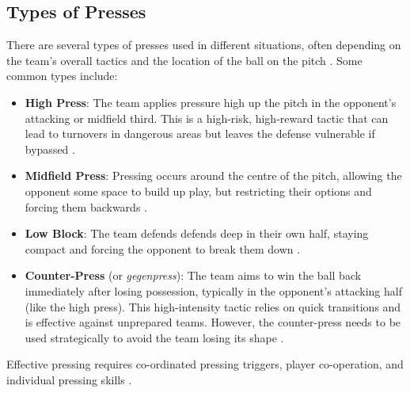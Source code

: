 \documentclass[12pt]{article}
\begin{document}
\subsection{Types of Presses}
There are several types of presses used in different situations, often depending on the team's overall tactics and the location of the ball on the pitch \cite{soccersourcecoaching}. Some common types include:
\begin{itemize}
    \item \textbf{High Press}: The team applies pressure high up the pitch in the opponent's attacking or midfield third. This is a high-risk, high-reward tactic that can lead to turnovers in dangerous areas but leaves the defense vulnerable if bypassed \cite{soccersourcecoaching}\cite{low2018exploring}.
    \item \textbf{Midfield Press}: Pressing occurs around the centre of the pitch, allowing the opponent some space to build up play, but restricting their options and forcing them backwards \cite{soccersourcecoaching}.
    \item \textbf{Low Block}: The team defends defends deep in their own half, staying compact and forcing the opponent to break them down \cite{soccersourcecoaching}\cite{low2018exploring}.
    \item \textbf{Counter-Press} (or \textit{gegenpress}): The team aims to win the ball back immediately after losing possession, typically in the opponent's attacking half (like the high press). This high-intensity tactic relies on quick transitions and is effective against unprepared teams. However, the counter-press needs to be used strategically to avoid the team losing its shape \cite{soccersourcecoaching}.
\end{itemize}

Effective pressing requires co-ordinated pressing triggers, player co-operation, and individual pressing skills \cite{modric2023influence}.
\end{document}
